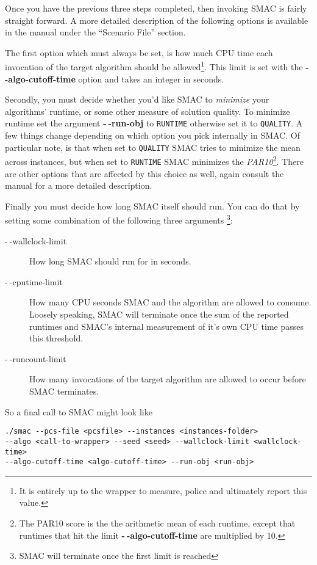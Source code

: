 \documentclass[11pt,letterpaper,twoside]{article}
\begin{document}
Once you have the previous three steps completed, then invoking SMAC is fairly straight forward. A more detailed description of the following options is available in the manual under the ``Scenario File'' section.

The first option which must always be set, is how much CPU time each invocation of
the target algorithm should be allowed\footnote{It is entirely up to the wrapper to measure, police and ultimately report this value.}. This limit is set with the \textbf{-$~\!$-algo-cutoff-time} option and takes an integer in seconds.

Secondly, you must decide whether you'd like SMAC to \emph{minimize} your algorithms' runtime, or some other measure of solution quality. To minimize runtime set the argument \textbf{-$~\!$-run-obj} to \texttt{RUNTIME} otherwise set it to \texttt{QUALITY}. A few things change depending on which option you pick internally in SMAC. Of particular note, is that when set to \texttt{QUALITY} SMAC tries to minimize the mean across instances, but when set to \texttt{RUNTIME} SMAC minimizes the \emph{PAR10}\footnote{The PAR10 score is the the arithmetic mean of each runtime, except that runtimes that hit the limit \textbf{-$~\!$-algo-cutoff-time} are multiplied by 10.}. There are other options that are affected by this choice as well, again consult the manual for a more detailed description.

Finally you must decide how long SMAC itself should run. You can do that by setting some combination of the following three arguments \footnote{SMAC will terminate once the first limit is reached}:

\begin{description}
\item[-$~\!$-wallclock-limit] How long SMAC should run for in seconds.
\item[-$~\!$-cputime-limit] How many CPU seconds SMAC and the algorithm are allowed to consume. Loosely speaking, SMAC will terminate once the sum of the reported runtimes and SMAC's internal measurement of it's own CPU time passes this threshold.
\item[-$~\!$-runcount-limit] How many invocations of the target algorithm are allowed to occur before SMAC terminates.
\end{description}

So a final call to SMAC might look like

\begin{verbatim}
./smac --pcs-file <pcsfile> --instances <instances-folder> 
--algo <call-to-wrapper> --seed <seed> --wallclock-limit <wallclock-time>
--algo-cutoff-time <algo-cutoff-time> --run-obj <run-obj>
\end{verbatim}
\end{document}
